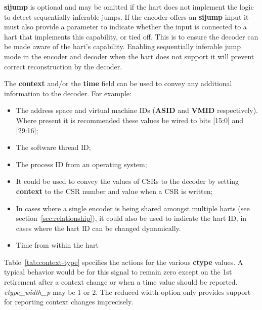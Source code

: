 \textbf{sijump} is optional and may be omitted if the hart does not implement the logic to detect
sequentially inferable jumps.  If the encoder offers an \textbf{sijump} input it must also provide a
parameter to indicate whether the input is connected to a hart that implements this capability, or
tied off.  This is to ensure the decoder can be made aware of the hart's capability.  Enabling 
sequentially inferable jump mode in the encoder and decoder when the hart does not support it will
prevent correct reconstruction by the decoder. 

The \textbf{context} and/or the \textbf{time} field can be used to convey any additional information to the decoder.  For example:

\begin{itemize}
  \item The address space and virtual machine IDs (\textbf{ASID} and \textbf{VMID}
  respectively).  Where present it is recommended these values be wired to bits [15:0] and [29:16];
  \item The software thread ID;
  \item The process ID from an operating system;
  \item It could be used to convey the values of CSRs to the decoder by setting \textbf{context} to the 
    CSR number and value when a CSR is written;
  \item In cases where a single encoder is being shared amongst multiple harts 
  (see section~\ref{sec:relationship}), it could also be used to indicate the hart ID, in cases where the 
  hart ID can be changed dynamically.
\item Time from within the hart
\end{itemize}

Table~\ref{tab:context-type} specifies the actions for the various
\textbf{ctype} values.  A typical behavior would be for this signal to
remain zero except on the 1st retirement after a context change
or when a time value should be reported.
\textit{ctype\_width\_p} may be 1 or 2.  The reduced width option only
provides support for reporting context changes imprecisely.


